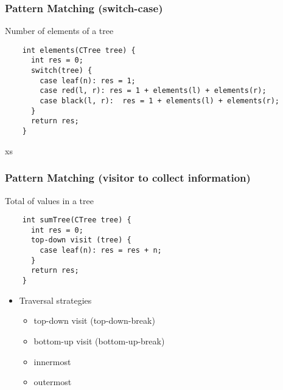 \documentclass{beamer}
\begin{document}
\begin{frame}[fragile]
  \frametitle{Pattern Matching (switch-case)}

  \begin{block}{Number of elements of a tree}
    \begin{small}
    \begin{verbatim}
    int elements(CTree tree) {
      int res = 0;
      switch(tree) {
        case leaf(n): res = 1;
        case red(l, r): res = 1 + elements(l) + elements(r);
        case black(l, r):  res = 1 + elements(l) + elements(r);
      }
      return res;
    }
\end{verbatim}
    \end{small}xs
  \end{block}  
  
\end{frame}

\begin{frame}[fragile]
  \frametitle{Pattern Matching (visitor to collect information)}

  \begin{block}{Total of values in a tree}
    \begin{small}
\begin{verbatim}
    int sumTree(CTree tree) {
      int res = 0;
      top-down visit (tree) {
        case leaf(n): res = res + n;
      }
      return res;
    }
\end{verbatim}
\end{small}
  \end{block}\pause

  \begin{itemize}
    \item Traversal strategies
      \begin{itemize}
        \item top-down visit (top-down-break)
        \item bottom-up visit (bottom-up-break)
        \item innermost
        \item outermost  
      \end{itemize}  
  \end{itemize}  
\end{frame}
\end{document}

